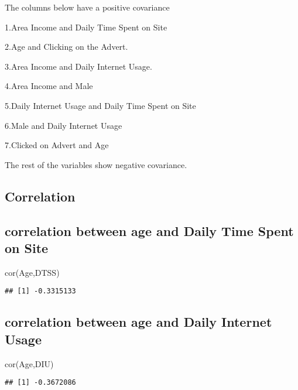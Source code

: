 \documentclass[
]{article}
\newenvironment{Shaded}{\begin{snugshade}}{\end{snugshade}}
\newcommand{\FunctionTok}[1]{\textcolor[rgb]{0.00,0.00,0.00}{#1}}
\newcommand{\NormalTok}[1]{#1}
\begin{document}
The columns below have a positive covariance

1.Area Income and Daily Time Spent on Site

2.Age and Clicking on the Advert.

3.Area Income and Daily Internet Usage.

4.Area Income and Male

5.Daily Internet Usage and Daily Time Spent on Site

6.Male and Daily Internet Usage

7.Clicked on Advert and Age

The rest of the variables show negative covariance.

\hypertarget{correlation}{%
\subsection{Correlation}\label{correlation}}

\hypertarget{correlation-between-age-and-daily-time-spent-on-site}{%
\subsection{correlation between age and Daily Time Spent on
Site}\label{correlation-between-age-and-daily-time-spent-on-site}}

\begin{Shaded}
\begin{Highlighting}[]
\FunctionTok{cor}\NormalTok{(Age,DTSS)}
\end{Highlighting}
\end{Shaded}

\begin{verbatim}
## [1] -0.3315133
\end{verbatim}

\hypertarget{correlation-between-age-and-daily-internet-usage}{%
\subsection{correlation between age and Daily Internet
Usage}\label{correlation-between-age-and-daily-internet-usage}}

\begin{Shaded}
\begin{Highlighting}[]
\FunctionTok{cor}\NormalTok{(Age,DIU)}
\end{Highlighting}
\end{Shaded}

\begin{verbatim}
## [1] -0.3672086
\end{verbatim}
\end{document}
